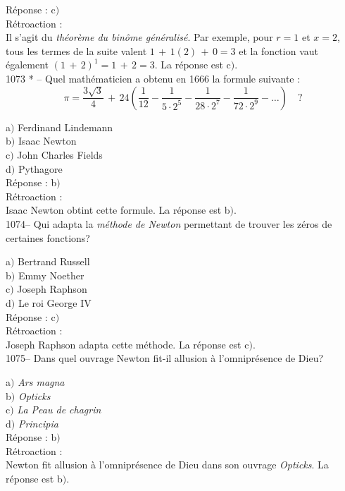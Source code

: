 ﻿\documentclass[letterpaper, 12pt]{article}
\begin{document}
R\'eponse : c$)$\\

R\'etroaction : \\
Il s'agit du {\sl th\'eor\`eme du bin\^ome g\'en\'eralis\'e}. Par
exemple, pour $r=1$ et $x=2$, tous les termes de la suite valent
$1\,+\,1(2)\,+\,0=3$ et la fonction vaut \'egalement
$(1\,+\,2)^1=1\,+\,2=3$.
La r\'eponse est c$)$.\\

1073 * -- Quel math\'ematicien a obtenu en 1666 la formule suivante
:
$$\displaystyle{\pi=\frac{3\sqrt3}4\,+\,24\left(\frac1{12}-\frac1{5\cdot2^5}-\frac1{28\cdot2^7}-\frac1{72\cdot2^9}-\ldots\right)}\quad?$$

a$)$ Ferdinand Lindemann \\
b$)$ Isaac Newton  \\
c$)$ John Charles Fields  \\
d$)$ Pythagore\\

R\'eponse : b$)$\\

R\'etroaction : \\
Isaac Newton obtint cette formule.
La r\'eponse est b$)$.\\

1074-- Qui adapta la {\sl m\'ethode de Newton} permettant de trouver
les z\'eros de certaines fonctions?

a$)$ Bertrand Russell \\
b$)$ Emmy Noether  \\
c$)$ Joseph Raphson  \\
d$)$ Le roi George IV\\

R\'eponse : c$)$\\

R\'etroaction : \\
Joseph Raphson adapta cette m\'ethode.
La r\'eponse est c$)$.\\

1075-- Dans quel ouvrage Newton fit-il allusion \`a l'omnipr\'esence
de Dieu?

a$)$ {\sl Ars magna} \\
b$)$ {\sl Opticks}  \\
c$)$ {\sl La Peau de chagrin}  \\
d$)$ {\sl Principia}\\

R\'eponse : b$)$\\

R\'etroaction : \\
Newton fit allusion \`a l'omnipr\'esence de Dieu dans son ouvrage
{\sl Opticks}.
La r\'eponse est b$)$.\\
\end{document}
